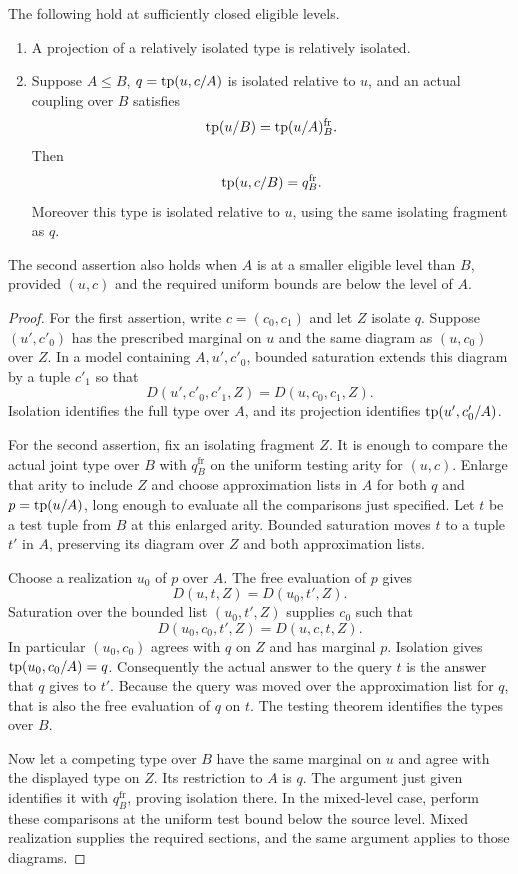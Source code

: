 \begin{lemma}\label{iso:free-isolation}\label{iso:upward-transfer}
The following hold at sufficiently closed eligible levels.
\begin{enumerate}
\item A projection of a relatively isolated type is relatively isolated.
\item Suppose $A\leq B$, $q=\operatorname{tp}(u,c/A)$ is isolated relative to $u$, and an
actual coupling over $B$ satisfies
\[
 \operatorname{tp}(u/B)=\operatorname{tp}(u/A)^{\mathrm{fr}}_B.
\]
Then
\[
 \operatorname{tp}(u,c/B)=q^{\mathrm{fr}}_B.
\]
Moreover this type is isolated relative to $u$, using the same isolating
fragment as $q$.
\end{enumerate}
The second assertion also holds when $A$ is at a smaller eligible level than
$B$, provided $(u,c)$ and the required uniform bounds are below the level of
$A$.
\end{lemma}

\begin{proof}
For the first assertion, write $c=(c_0,c_1)$ and let $Z$ isolate $q$.
Suppose $(u',c'_0)$ has the prescribed marginal on $u$ and the same diagram
as $(u,c_0)$ over $Z$. In a model containing $A,u',c'_0$, bounded saturation
extends this diagram by a tuple $c'_1$ so that
\[
 D(u',c'_0,c'_1,Z)=D(u,c_0,c_1,Z).
\]
Isolation identifies the full type over $A$, and its projection identifies
$\operatorname{tp}(u',c'_0/A)$.

For the second assertion, fix an isolating fragment $Z$. It is enough to
compare the actual joint type over $B$ with $q^{\mathrm{fr}}_B$ on the
uniform testing arity for $(u,c)$. Enlarge that arity to include $Z$ and
choose approximation lists in $A$ for both $q$ and $p=\operatorname{tp}(u/A)$, long enough
to evaluate all the comparisons just specified. Let $t$ be a test tuple
from $B$ at this enlarged arity. Bounded saturation moves $t$ to a tuple
$t'$ in $A$, preserving its diagram over $Z$ and both approximation lists.

Choose a realization $u_0$ of $p$ over $A$. The free evaluation of $p$ gives
\[
 D(u,t,Z)=D(u_0,t',Z).
\]
Saturation over the bounded list $(u_0,t',Z)$ supplies $c_0$ such that
\[
 D(u_0,c_0,t',Z)=D(u,c,t,Z).
\]
In particular $(u_0,c_0)$ agrees with $q$ on $Z$ and has marginal $p$.
Isolation gives $\operatorname{tp}(u_0,c_0/A)=q$. Consequently the actual answer to the
query $t$ is the answer that $q$ gives to $t'$. Because the query was moved
over the approximation list for $q$, that is also the free evaluation of
$q$ on $t$. The testing theorem identifies the types over $B$.

Now let a competing type over $B$ have the same marginal on $u$ and agree
with the displayed type on $Z$. Its restriction to $A$ is $q$. The argument
just given identifies it with $q^{\mathrm{fr}}_B$, proving isolation there.
In the mixed-level case, perform these comparisons at the uniform test
bound below the source level. Mixed realization supplies the required
sections, and the same argument applies to those diagrams.
\end{proof}

